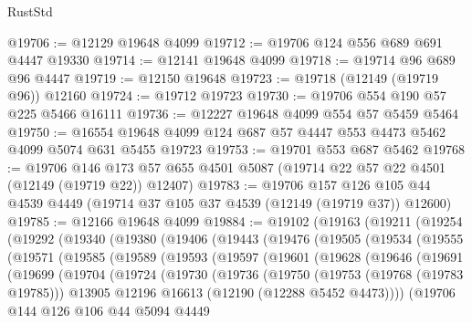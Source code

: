 \begin{lexlean}{RustStd}
\begin{coremodule}
@19706 := @12129 @19648 @4099
@19712 := @19706 @124 @556 @689 @691 @4447 @19330
@19714 := @12141 @19648 @4099
@19718 := @19714 @96 @689 @96 @4447
@19719 := @12150 @19648
@19723 := @19718 (@12149 (@19719 @96)) @12160
@19724 := @19712 @19723
@19730 := @19706 @554 @190 @57 @225 @5466 @16111
@19736 := @12227 @19648 @4099 @554 @57 @5459 @5464
@19750 := @16554 @19648 @4099 @124 @687 @57 @4447 @553 @4473 @5462 @4099 @5074 @631 @5455 @19723
@19753 := @19701 @553 @687 @5462
@19768 := @19706
    @146
    @173
    @57
    @655
    @4501
    @5087
    (@19714 @22 @57 @22 @4501 (@12149 (@19719 @22)) @12407)
@19783 := @19706
    @157
    @126
    @105
    @44
    @4539
    @4449
    (@19714 @37 @105 @37 @4539 (@12149 (@19719 @37)) @12600)
@19785 := @12166 @19648 @4099
@19884 := @19102
    (@19163
      (@19211
        (@19254
          (@19292
            (@19340
              (@19380
                (@19406
                  (@19443
                    (@19476
                      (@19505
                        (@19534
                          (@19555
                            (@19571
                              (@19585
                                (@19589
                                  (@19593
                                    (@19597
                                      (@19601
                                        (@19628
                                          (@19646
                                            (@19691
                                              (@19699
                                                (@19704
                                                  (@19724
                                                    (@19730
                                                      (@19736
                                                        (@19750
                                                          (@19753 (@19768 (@19783 @19785)))
                                                          @13905
                                                          @12196
                                                          @16613
                                                          (@12190 (@12288 @5452 @4473))))
                                                      (@19706
                                                        @144
                                                        @126
                                                        @106
                                                        @44
                                                        @5094
                                                        @4449

\end{coremodule}
\end{lexlean}
